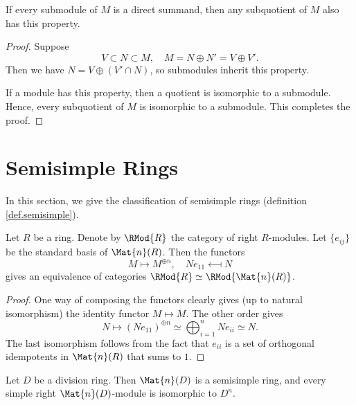 \documentclass{article}
\begin{document}
\begin{lemma}
    If every submodule of $M$ is a direct summand, then any subquotient of $M$ also has this property.
\end{lemma}

\begin{proof}
    Suppose
    \begin{equation*}
        V\subset N\subset M,\quad M=N\oplus N'=V\oplus V'.
    \end{equation*}
    Then we have $N=V\oplus(V'\cap N)$, so submodules inherit this property.

    If a module has this property, then a quotient is isomorphic to a submodule.
    Hence, every subquotient of $M$ is isomorphic to a submodule. This completes the proof.
\end{proof}

\section{Semisimple Rings}

In this section, we give the classification of semisimple rings (definition \ref{def.semisimple}).

\begin{lemma}
    Let $R$ be a ring. Denote by $\RMod{R}$ the category of right $R$-modules. Let $\{e_{ij}\}$ be the standard basis of $\Mat{n}(R)$. 
    Then the functors
    \begin{equation*}
        M \longmapsto M^{\oplus n},\quad Ne_{11}\longmapsfrom N
    \end{equation*}
    gives an equivalence of categories $\RMod{R}\simeq\RMod{\Mat{n}(R)}$.
\end{lemma}

\begin{proof}
    One way of composing the functors clearly gives (up to natural isomorphism) the identity functor $M\longmapsto M$. The other order gives
    \begin{equation*}
        N\longmapsto (Ne_{11})^{\oplus n}\simeq 
        \bigoplus_{i=1}^n Ne_{ii}\simeq N.
    \end{equation*}
    The last isomorphism follows from the fact that $e_{ii}$ is a set of orthogonal idempotents in $\Mat{n}(R)$ that sums to $1$.
\end{proof}

\begin{corollary}\label{cor.matDss}
    Let $D$ be a division ring. 
    Then $\Mat{n}(D)$ is a semisimple ring, and every simple right $\Mat{n}(D)$-module is isomorphic to $D^n$.
\end{corollary}
\end{document}
